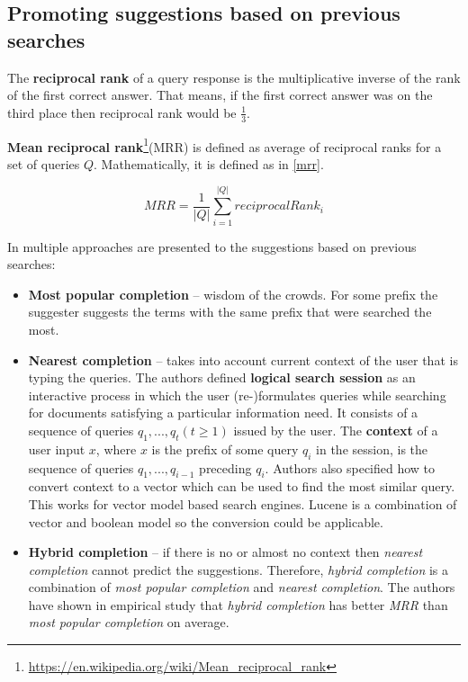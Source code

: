 \subsection{Promoting suggestions based on previous searches}
The \textbf{reciprocal rank} of a query response is the multiplicative inverse of the rank of the first correct answer.
That means, if the first correct answer was on the third place then reciprocal rank would be $\frac{1}{3}$.

\textbf{Mean reciprocal rank}\footnote{\url{https://en.wikipedia.org/wiki/Mean\_reciprocal\_rank}}(MRR) is defined as
average of reciprocal ranks for a set of queries $Q$. Mathematically, it is defined as in \ref{mrr}.

\begin{equation}
\label{mrr}
MRR = \frac{1}{\vert Q \vert} \sum_{i=1}^{\vert Q \vert} reciprocalRank_i
\end{equation}

In \citep{Bar-yossef11context-sensitivequery} multiple approaches are presented to the suggestions based on previous
searches:
\begin{itemize}
    \item \textbf{Most popular completion} – wisdom of the crowds. For some prefix the suggester suggests the terms
    with the same prefix that were searched the most.
    \item \textbf{Nearest completion} – takes into account current context of the user that is typing the queries.
    The authors defined \textbf{logical search session} as an interactive process in which the user (re-)formulates queries
    while searching for documents satisfying a particular information need. It consists of a sequence of
    queries $q_1, . . . , q_t (t \geq 1)$ issued by the user. The \textbf{context} of a user input $x$, where $x$ is the prefix of
    some query $q_i$ in the session, is the sequence of queries $q_1, . . . , q_{i-1}$ preceding $q_i$.
    Authors also specified how to convert context to a vector which can be used to find the most similar query.
    This works for vector model based search engines. Lucene is a combination of vector and boolean model so the
    conversion could be applicable.

    \item \textbf{Hybrid completion} – if there is no or almost no context then \textit{nearest completion} cannot predict the
    suggestions. Therefore, \textit{hybrid completion} is a combination of \textit{most popular completion} and \textit{nearest completion}.
    The authors have shown in empirical study that \textit{hybrid completion} has better \textit{MRR} than
    \textit{most popular completion} on average.
\end{itemize}


